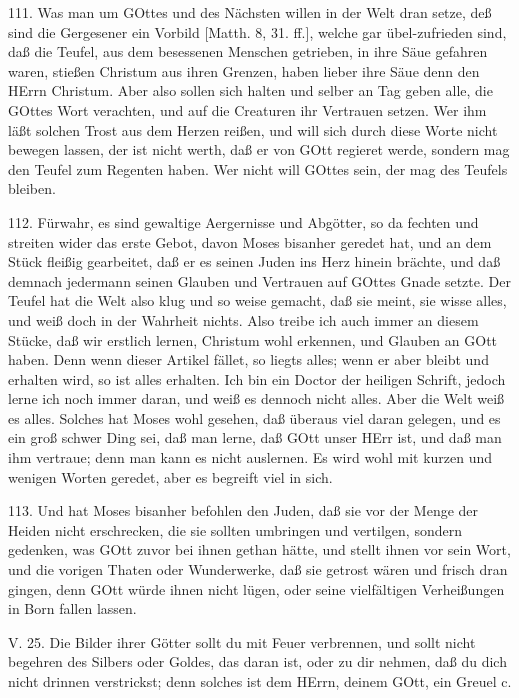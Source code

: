 111. Was man um GOttes und des Nächsten willen in der Welt dran setze, deß sind die Gergesener ein Vorbild [Matth. 8, 31. ff.], welche gar übel-zufrieden sind, daß die Teufel, aus dem besessenen Menschen getrieben, in ihre Säue gefahren waren, stießen Christum aus ihren Grenzen, haben lieber ihre Säue denn den HErrn Christum. Aber also sollen sich halten und selber an Tag geben alle, die GOttes Wort verachten, und auf die Creaturen ihr Vertrauen setzen. Wer ihm läßt solchen Trost aus dem Herzen reißen, und will sich durch diese Worte nicht bewegen lassen, der ist nicht werth, daß er von GOtt regieret werde, sondern mag den Teufel zum Regenten haben. Wer nicht will GOttes sein, der mag des Teufels bleiben.

112. Fürwahr, es sind gewaltige Aergernisse und Abgötter, so da fechten und streiten wider das erste Gebot, davon Moses bisanher geredet hat, und an dem Stück fleißig gearbeitet, daß er es seinen Juden ins Herz hinein brächte, und daß demnach jedermann seinen Glauben und Vertrauen auf GOttes Gnade setzte. Der Teufel hat die Welt also klug und so weise gemacht, daß sie meint, sie wisse alles, und weiß doch in der Wahrheit nichts. Also treibe ich auch immer an diesem Stücke, daß wir erstlich lernen, Christum wohl erkennen, und Glauben an GOtt haben. Denn wenn dieser Artikel fället, so liegts alles; wenn er aber bleibt und erhalten wird, so ist alles erhalten. Ich bin ein Doctor der heiligen Schrift, jedoch lerne ich noch immer daran, und weiß es dennoch nicht alles. Aber die Welt weiß es alles. Solches hat Moses wohl gesehen, daß überaus viel daran gelegen, und es ein groß schwer Ding sei, daß man lerne, daß GOtt unser HErr ist, und daß man ihm vertraue; denn man kann es nicht auslernen. Es wird wohl mit kurzen und wenigen Worten geredet, aber es begreift viel in sich.

113. Und hat Moses bisanher befohlen den Juden, daß sie vor der Menge der Heiden nicht erschrecken, die sie sollten umbringen und vertilgen, sondern gedenken, was GOtt zuvor bei ihnen gethan hätte, und stellt ihnen vor sein Wort, und die vorigen Thaten oder Wunderwerke, daß sie getrost wären und frisch dran gingen, denn GOtt würde ihnen nicht lügen, oder seine vielfältigen Verheißungen in Born fallen lassen.

\begin{schriftzitat}
V. 25. Die Bilder ihrer Götter sollt du mit Feuer verbrennen, und sollt nicht begehren des Silbers oder Goldes, das daran ist, oder zu dir nehmen, daß du dich nicht drinnen verstrickst; denn solches ist dem HErrn, deinem GOtt, ein Greuel c.
\end{schriftzitat}

